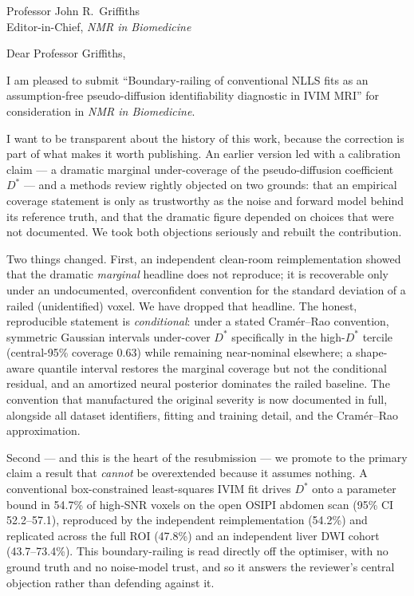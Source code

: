 \documentclass[11pt]{letter}
\begin{document}
\begin{letter}{Professor John R.\ Griffiths \\ Editor-in-Chief, \textit{NMR in Biomedicine}}
\opening{Dear Professor Griffiths,}

I am pleased to submit ``Boundary-railing of conventional NLLS fits as an
assumption-free pseudo-diffusion identifiability diagnostic in IVIM MRI'' for
consideration in \textit{NMR in Biomedicine}.

I want to be transparent about the history of this work, because the correction is
part of what makes it worth publishing. An earlier version led with a calibration
claim --- a dramatic marginal under-coverage of the pseudo-diffusion coefficient
$D^{*}$ --- and a methods review rightly objected on two grounds: that an empirical
coverage statement is only as trustworthy as the noise and forward model behind its
reference truth, and that the dramatic figure depended on choices that were not
documented. We took both objections seriously and rebuilt the contribution.

Two things changed. First, an independent clean-room reimplementation showed that
the dramatic \emph{marginal} headline does not reproduce; it is recoverable only
under an undocumented, overconfident convention for the standard deviation of a
railed (unidentified) voxel. We have dropped that headline. The honest, reproducible
statement is \emph{conditional}: under a stated Cram\'er--Rao convention, symmetric
Gaussian intervals under-cover $D^{*}$ specifically in the high-$D^{*}$ tercile
(central-95\% coverage 0.63) while remaining near-nominal elsewhere; a shape-aware
quantile interval restores the marginal coverage but not the conditional residual,
and an amortized neural posterior dominates the railed baseline. The convention that
manufactured the original severity is now documented in full, alongside all dataset
identifiers, fitting and training detail, and the Cram\'er--Rao approximation.

Second --- and this is the heart of the resubmission --- we promote to the primary
claim a result that \emph{cannot} be overextended because it assumes nothing.
A conventional box-constrained least-squares IVIM fit drives $D^{*}$ onto a
parameter bound in 54.7\% of high-SNR voxels on the open OSIPI abdomen scan (95\%
CI 52.2--57.1), reproduced by the independent reimplementation (54.2\%) and
replicated across the full ROI (47.8\%) and an independent liver DWI cohort
(43.7--73.4\%). This boundary-railing is read directly off the optimiser, with no
ground truth and no noise-model trust, and so it answers the reviewer's central
objection rather than defending against it.


\end{letter}
\end{document}
